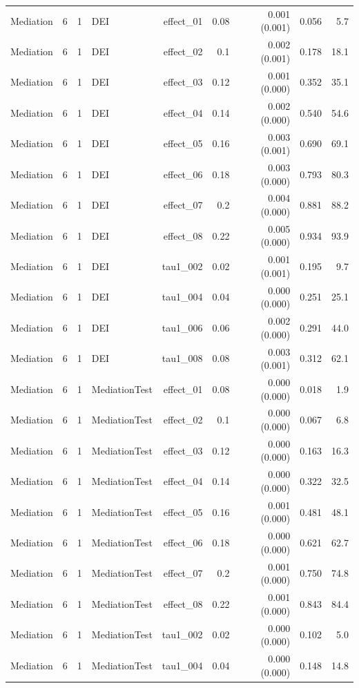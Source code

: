 \begin{longtable}{lcclrrrrr}
Mediation & 6 & 1 & DEI & effect\_01 & 0.08 & 0.001 (0.001) & 0.056 & 5.7\\
Mediation & 6 & 1 & DEI & effect\_02 & 0.1 & 0.002 (0.001) & 0.178 & 18.1\\
Mediation & 6 & 1 & DEI & effect\_03 & 0.12 & 0.001 (0.000) & 0.352 & 35.1\\
Mediation & 6 & 1 & DEI & effect\_04 & 0.14 & 0.002 (0.000) & 0.540 & 54.6\\
Mediation & 6 & 1 & DEI & effect\_05 & 0.16 & 0.003 (0.001) & 0.690 & 69.1\\
Mediation & 6 & 1 & DEI & effect\_06 & 0.18 & 0.003 (0.000) & 0.793 & 80.3\\
Mediation & 6 & 1 & DEI & effect\_07 & 0.2 & 0.004 (0.000) & 0.881 & 88.2\\
Mediation & 6 & 1 & DEI & effect\_08 & 0.22 & 0.005 (0.000) & 0.934 & 93.9\\
Mediation & 6 & 1 & DEI & tau1\_002 & 0.02 & 0.001 (0.001) & 0.195 & 9.7\\
Mediation & 6 & 1 & DEI & tau1\_004 & 0.04 & 0.000 (0.000) & 0.251 & 25.1\\
Mediation & 6 & 1 & DEI & tau1\_006 & 0.06 & 0.002 (0.000) & 0.291 & 44.0\\
Mediation & 6 & 1 & DEI & tau1\_008 & 0.08 & 0.003 (0.001) & 0.312 & 62.1\\
Mediation & 6 & 1 & MediationTest & effect\_01 & 0.08 & 0.000 (0.000) & 0.018 & 1.9\\
Mediation & 6 & 1 & MediationTest & effect\_02 & 0.1 & 0.000 (0.000) & 0.067 & 6.8\\
Mediation & 6 & 1 & MediationTest & effect\_03 & 0.12 & 0.000 (0.000) & 0.163 & 16.3\\
Mediation & 6 & 1 & MediationTest & effect\_04 & 0.14 & 0.000 (0.000) & 0.322 & 32.5\\
Mediation & 6 & 1 & MediationTest & effect\_05 & 0.16 & 0.001 (0.000) & 0.481 & 48.1\\
Mediation & 6 & 1 & MediationTest & effect\_06 & 0.18 & 0.000 (0.000) & 0.621 & 62.7\\
Mediation & 6 & 1 & MediationTest & effect\_07 & 0.2 & 0.001 (0.000) & 0.750 & 74.8\\
Mediation & 6 & 1 & MediationTest & effect\_08 & 0.22 & 0.001 (0.000) & 0.843 & 84.4\\
Mediation & 6 & 1 & MediationTest & tau1\_002 & 0.02 & 0.000 (0.000) & 0.102 & 5.0\\
Mediation & 6 & 1 & MediationTest & tau1\_004 & 0.04 & 0.000 (0.000) & 0.148 & 14.8\\

\end{longtable}
